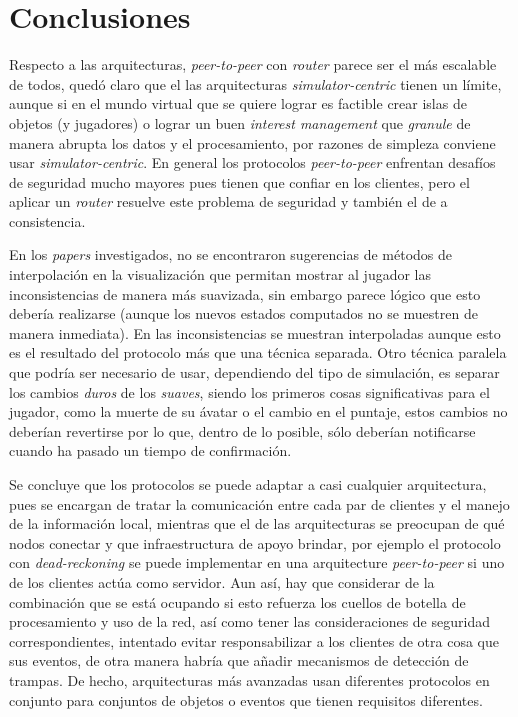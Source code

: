 \section{Conclusiones}

Respecto a las arquitecturas, \emph{peer-to-peer} con \emph{router} parece ser el más escalable de todos, quedó claro que el las arquitecturas \emph{simulator-centric} tienen un límite, aunque si en el mundo virtual que se quiere lograr es factible crear islas de objetos (y jugadores) o lograr un buen \emph{interest management} que \emph{granule} de manera abrupta los datos y el procesamiento, por razones de simpleza conviene usar \emph{simulator-centric}. En general los protocolos \emph{peer-to-peer} enfrentan desafíos de seguridad mucho mayores pues tienen que confiar en los clientes, pero el aplicar un \emph{router} resuelve este problema de seguridad y también el de a consistencia.

En los \emph{papers} investigados, no se encontraron sugerencias de métodos de interpolación en la visualización que permitan mostrar al jugador las inconsistencias de manera más suavizada, sin embargo parece lógico que esto debería realizarse (aunque los nuevos estados computados no se muestren de manera inmediata). En \cite{li2004supporting} las inconsistencias se muestran interpoladas aunque esto es el resultado del protocolo más que una técnica separada. Otro técnica paralela que podría ser necesario de usar, dependiendo del tipo de simulación, es separar los cambios \emph{duros} de los \emph{suaves}, siendo los primeros cosas significativas para el jugador, como la muerte de su ávatar o el cambio en el puntaje, estos cambios no deberían revertirse por lo que, dentro de lo posible, sólo deberían notificarse cuando ha pasado un tiempo de confirmación.

Se concluye que los protocolos se puede adaptar a casi cualquier arquitectura, pues se encargan de tratar la comunicación entre cada par de clientes y el manejo de la información local, mientras que el de las arquitecturas se preocupan de qué nodos conectar y que infraestructura de apoyo brindar, por ejemplo el protocolo con \emph{dead-reckoning} se puede implementar en una arquitecture \emph{peer-to-peer} si uno de los clientes actúa como servidor. Aun así, hay que considerar de la combinación que se está ocupando si esto refuerza los cuellos de botella de procesamiento y uso de la red, así como tener las consideraciones de seguridad correspondientes, intentado evitar responsabilizar a los clientes de otra cosa que sus eventos, de otra manera habría que añadir mecanismos de detección de trampas. De hecho, arquitecturas más avanzadas usan diferentes protocolos en conjunto para conjuntos de objetos o eventos que tienen requisitos diferentes.

